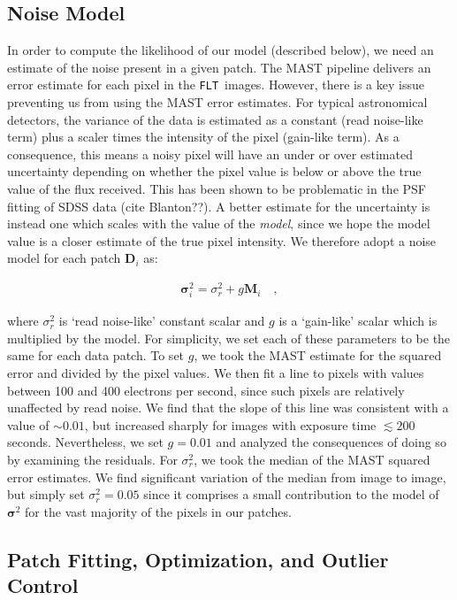 \documentclass[12pt,letterpaper,preprint]{aastex}
\newcommand{\vect}[1]{\mathbf{#1}}
\newcommand{\FLT}{\texttt{FLT}}
\newcommand{\data}{\vect{D}}
\newcommand{\model}{\vect{M}}
\newcommand{\var}{\vect{\sigma}^2}
\begin{document}
\subsection{Noise Model}
\label{ssec:noise}

In order to compute the likelihood of our model (described below), we need an estimate of the noise 
present in a given patch.  The MAST pipeline delivers an error estimate for each pixel in the \FLT\ images.   
However, there is a key issue preventing us from using the MAST error estimates.  
For typical astronomical detectors, the variance of 
the data is estimated as a constant (read noise-like term) plus a scaler times the intensity of the pixel 
(gain-like term).  As a consequence, this means a noisy pixel will have an under or over estimated uncertainty depending 
on whether the pixel value is below or above the true value of the flux received.  This has been shown to be 
problematic in the PSF fitting of SDSS data (cite Blanton??).  A better estimate for the uncertainty is 
instead one which scales with the value of the \emph{model}, since we hope the model value is a 
closer estimate of the true pixel intensity.  We therefore adopt a noise model for each patch $\data_i$
as:

\begin{eqnarray}
\var_i =  \sigma_{r}^2 + g \model_i
\quad , 
\label{eqn:model-noflat}
\end{eqnarray}

\noindent where $\sigma_{r}^2$ is `read noise-like' constant scalar and $g$ is a `gain-like' scalar 
which is multiplied by the model.  For simplicity, we set each of these parameters to be the same 
for each data patch.  To set $g$, we took the MAST estimate for the squared error and 
divided by the pixel values.  We then fit a line to pixels with values between 100 and 
400 electrons per second, since such pixels are relatively unaffected by read noise.  We find that 
the slope of this line was consistent with a value of 
$\sim0.01$, but increased sharply for images with exposure time $\lesssim 200$ seconds.  
Nevertheless, we set $g=0.01$ and analyzed the consequences of doing so by examining the 
residuals.  For $\sigma_{r}^2$, we took the median of the MAST squared error estimates.  We find 
significant variation of the median from image to image, but simply set $\sigma_{r}^2=0.05$ since 
it comprises a small contribution to the model of $\var$ for the vast majority of the pixels in our 
patches.

\subsection{Patch Fitting, Optimization, and Outlier Control}
\label{ssec:optimization}
\end{document}
